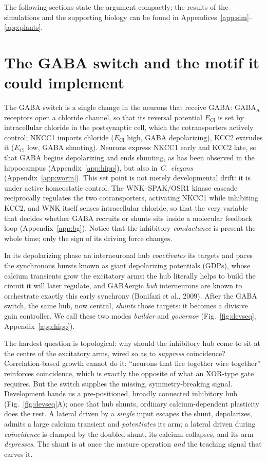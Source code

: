 \documentclass[11pt,a4paper]{article}
\newcommand{\ECl}{E_{\mathrm{Cl}}}
\begin{document}
The following sections state the argument compactly; the results of the simulations and the supporting biology can be found in Appendices~\ref{app:sim}--\ref{app:plants}.

\section{The GABA switch and the motif it could implement}\label{sec:switch}
The GABA switch is a single change in the neurons that receive GABA: GABA$_{\mathrm{A}}$ receptors open a chloride channel, so that its reversal potential $\ECl$ is set by intracellular chloride in the postsynaptic cell, which the cotransporters actively control; NKCC1 imports chloride ($\ECl$ high, GABA depolarizing), KCC2 extrudes it ($\ECl$ low, GABA shunting). Neurons express NKCC1 early and KCC2 late, so that GABA begins depolarizing and ends shunting, as has been observed in the hippocampus (Appendix~\ref{app:hipp}), but also in \emph{C.~elegans} (Appendix~\ref{app:worm}). This set point is not merely developmental drift: it is under active homeostatic control. The WNK--SPAK/OSR1 kinase cascade reciprocally regulates the two cotransporters, activating NKCC1 while inhibiting KCC2, and WNK itself senses intracellular chloride, so that the very variable that decides whether GABA recruits or shunts sits inside a molecular feedback loop (Appendix~\ref{app:bg}). Notice that the inhibitory \emph{conductance} is present the whole time; only the sign of its driving force changes.

In its depolarizing phase an interneuronal hub \emph{coactivates} its targets and paces the synchronous bursts known as giant depolarizing potentials (GDPs), whose calcium transients grow the excitatory arms: the hub literally helps to build the circuit it will later regulate, and GABAergic \emph{hub} interneurons are known to orchestrate exactly this early synchrony (Bonifazi et al., 2009). After the GABA switch, the same hub, now central, \emph{shunts} those targets: it becomes a divisive gain controller. We call these two modes \emph{builder} and \emph{governor} (Fig.~\ref{fig:devseq}, Appendix~\ref{app:hipp}).

The hardest question is topological: why should the inhibitory hub come to sit at the centre of the excitatory arms, wired so as to \emph{suppress} coincidence? Correlation-based growth cannot do it: ``neurons that fire together wire together'' reinforces coincidence, which is exactly the opposite of what an XOR-type gate requires. But the switch supplies the missing, symmetry-breaking signal. Development hands us a pre-positioned, broadly connected inhibitory hub (Fig.~\ref{fig:devseq}A); once that hub shunts, ordinary calcium-dependent plasticity does the rest. A lateral driven by a \emph{single} input escapes the shunt, depolarizes, admits a large calcium transient and \emph{potentiates} its arm; a lateral driven during \emph{coincidence} is clamped by the doubled shunt, its calcium collapses, and its arm \emph{depresses}. The shunt is at once the mature operation \emph{and} the teaching signal that carves it.
\end{document}
